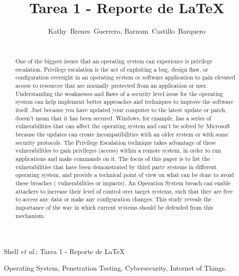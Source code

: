 \documentclass[letterpaper, 10pt, journal]{IEEEtran}
\begin{document}
\title{Tarea 1 - Reporte de \LaTeX}
\author{Kathy~Brenes~Guerrero, Barnum~Castillo~Barquero

~}%

%
{Shell \MakeLowercase{\textit{et al.}}: Tarea 1 - Reporte de \LaTeX}
\maketitle

\begin{abstract}
One of the biggest issues that an operating system can experience is privilege escalation. Privilege escalation is the act of exploiting a bug, design flaw, or configuration oversight in an operating system or software application to gain elevated access to resources that are normally protected from an application or user. Understanding the weaknesses and flaws of a security level issue for the operating system can help implement better approaches and techniques to improve the software itself. Just because you have updated your computer to the latest update or patch, doesn’t mean that it has been secured. Windows, for example, has a series of vulnerabilities that can affect the operating system and can't be solved by Microsoft because the updates can create incompatibilities with an older system or with some security protocols. The Privilege Escalation technique takes advantage of these vulnerabilities to  gain privileges (access) within a remote  system, in order to run applications and make commands on it. The focus of this paper is to list the vulnerabilities that have been demonstrated by third party systems in different operating system, and provide a technical point of view  on what can be done to avoid these breaches ( vulnerabilities or impacts). An Operation System breach can enable attackers to increase their level of control over target systems, such that they are free to access any data or make any configuration changes\cite{Williams}. This study reveals the importance of the way in which current systems should be defended from this mechanism.
\end{abstract}
\begin{IEEEkeywords}
Operating System, Penetration Testing, Cybersecurity, Internet of Things.
\end{IEEEkeywords}
\end{document}
